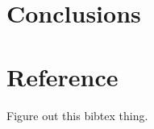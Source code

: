 \documentclass{article}
\begin{document}
\section{Conclusions}
\section{Reference}
Figure out this bibtex thing.
\end{document}
